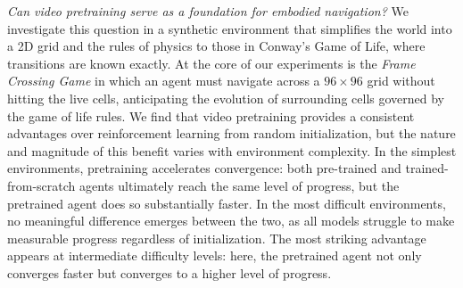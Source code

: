 \textit{Can video pretraining serve as a foundation for embodied navigation?} We investigate this question in a synthetic environment that simplifies the world into a 2D grid and the rules of physics to those in Conway's Game of Life, where transitions are known exactly. At the core of our experiments is the \textit{Frame Crossing Game} in which an agent must navigate across a $96 \times 96$ grid without hitting the live cells, anticipating the evolution of surrounding cells governed by the game of life rules.  We find that video pretraining provides a consistent advantages over reinforcement learning from random initialization, but the nature and magnitude of this benefit varies with environment complexity. In the simplest environments, pretraining accelerates convergence: both pre-trained and trained-from-scratch agents ultimately reach the same level of progress, but the pretrained agent does so substantially faster. In the most difficult environments, no meaningful difference emerges between the two, as all models struggle to make measurable progress regardless of initialization. The most striking advantage appears at intermediate difficulty levels: here, the pretrained agent not only converges faster but converges to a higher level of progress.
